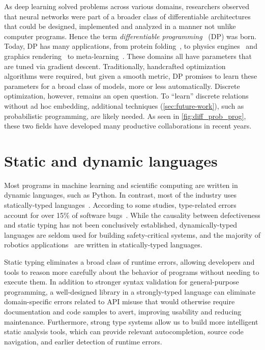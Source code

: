 \documentclass[12pt,initial,twoside,maitrise]{dms}
\numberwithin{equation}{section}
\numberwithin{table}{chapter}
\numberwithin{figure}{chapter}
\begin{document}
As deep learning solved problems across various domains, researchers observed that neural networks were part of a broader class of differentiable architectures that could be designed, implemented and analyzed in a manner not unlike computer programs. Hence the term \textit{differentiable programming}~\citep{olah2015neural} (DP) was born. Today, DP has many applications, from protein folding~\citep{alquraishi2018end}, to physics engines~\citep{hu2019difftaichi, de2018end, degrave2016differentiable} and graphics rendering~\citep{loper2014opendr} to meta-learning~\citep{liu2018darts}. These domains all have parameters that are tuned via gradient descent. Traditionally, handcrafted optimization algorithms were required, but given a smooth metric, DP promises to learn these parameters for a broad class of models, more or less automatically. Discrete optimization, however, remains an open question. To ``learn'' discrete relations without ad hoc embedding, additional techniques (\autoref{sec:future-work}), such as probabilistic programming, are likely needed. As seen in \autoref{fig:diff_prob_prog}, these two fields have developed many productive collaborations in recent years.

\section{Static and dynamic languages}

Most programs in machine learning and scientific computing are written in dynamic languages, such as Python. In contrast, most of the industry uses statically-typed languages~\citep{github}. According to some studies, type-related errors account for over 15\% of software bugs~\citep{gao2017type}. While the causality between defectiveness and static typing has not been conclusively established, dynamically-typed languages are seldom used for building safety-critical systems, and the majority of robotics applications~\citep{Areserio54:online} are written in statically-typed languages.

Static typing eliminates a broad class of runtime errors, allowing developers and tools to reason more carefully about the behavior of programs without needing to execute them. In addition to stronger syntax validation for general-purpose programming, a well-designed library in a strongly-typed language can eliminate domain-specific errors related to API misuse that would otherwise require documentation and code samples to avert, improving usability and reducing maintenance. Furthermore, strong type systems allow us to build more intelligent static analysis tools, which can provide relevant autocompletion, source code navigation, and earlier detection of runtime errors.
\end{document}
